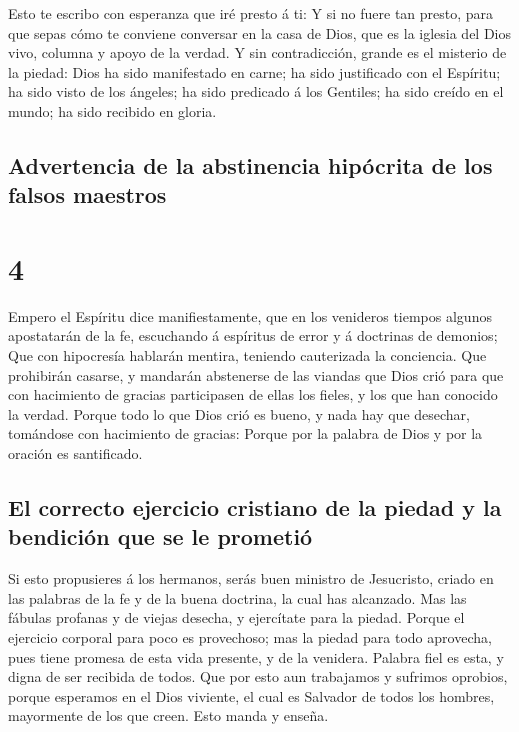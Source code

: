  Esto te escribo con esperanza que iré presto á ti:
 Y si no fuere tan presto, para que sepas cómo te
conviene conversar en la casa de Dios, que es la iglesia del Dios vivo,
columna y apoyo de la verdad.  Y sin contradicción,
grande es el misterio de la piedad: Dios ha sido manifestado en carne;
ha sido justificado con el Espíritu; ha sido visto de los ángeles; ha
sido predicado á los Gentiles; ha sido creído en el mundo; ha sido
recibido en gloria.

\hypertarget{advertencia-de-la-abstinencia-hipuxf3crita-de-los-falsos-maestros}{%
\subsection{Advertencia de la abstinencia hipócrita de los falsos
maestros}\label{advertencia-de-la-abstinencia-hipuxf3crita-de-los-falsos-maestros}}

\hypertarget{section-3}{%
\section{4}\label{section-3}}

 Empero el Espíritu dice manifiestamente, que en los
venideros tiempos algunos apostatarán de la fe, escuchando á espíritus
de error y á doctrinas de demonios;  Que con hipocresía
hablarán mentira, teniendo cauterizada la conciencia.  Que
prohibirán casarse, y mandarán abstenerse de las viandas que Dios crió
para que con hacimiento de gracias participasen de ellas los fieles, y
los que han conocido la verdad.  Porque todo lo que Dios
crió es bueno, y nada hay que desechar, tomándose con hacimiento de
gracias:  Porque por la palabra de Dios y por la oración
es santificado.

\hypertarget{el-correcto-ejercicio-cristiano-de-la-piedad-y-la-bendiciuxf3n-que-se-le-prometiuxf3}{%
\subsection{El correcto ejercicio cristiano de la piedad y la bendición
que se le
prometió}\label{el-correcto-ejercicio-cristiano-de-la-piedad-y-la-bendiciuxf3n-que-se-le-prometiuxf3}}

 Si esto propusieres á los hermanos, serás buen ministro
de Jesucristo, criado en las palabras de la fe y de la buena doctrina,
la cual has alcanzado.  Mas las fábulas profanas y de
viejas desecha, y ejercítate para la piedad.  Porque el
ejercicio corporal para poco es provechoso; mas la piedad para todo
aprovecha, pues tiene promesa de esta vida presente, y de la venidera.
 Palabra fiel es esta, y digna de ser recibida de todos.
 Que por esto aun trabajamos y sufrimos oprobios, porque
esperamos en el Dios viviente, el cual es Salvador de todos los hombres,
mayormente de los que creen.  Esto manda y enseña.

